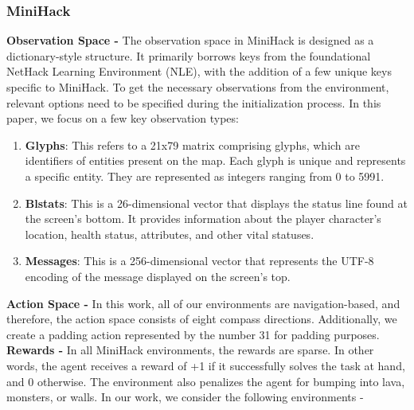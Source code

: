 \documentclass[]{fairmeta}
\begin{document}
\subsubsection{MiniHack}
\textbf{Observation Space - }
The observation space in MiniHack is designed as a dictionary-style structure. It primarily borrows keys from the foundational NetHack Learning Environment (NLE), with the addition of a few unique keys specific to MiniHack. To get the necessary observations from the environment, relevant options need to be specified during the initialization process. In this paper, we focus on a few key observation types:
\begin{enumerate}
    \item \textbf{Glyphs}: This refers to a 21x79 matrix comprising glyphs, which are identifiers of entities present on the map. Each glyph is unique and represents a specific entity. They are represented as integers ranging from 0 to 5991.
    \item \textbf{Blstats}: This is a 26-dimensional vector that displays the status line found at the screen's bottom. It provides information about the player character's location, health status, attributes, and other vital statuses.
    \item \textbf{Messages}: This is a 256-dimensional vector that represents the UTF-8 encoding of the message displayed on the screen's top.
\end{enumerate}
\textbf{Action Space - } In this work, all of our environments are navigation-based, and therefore, the action space consists of eight compass directions. Additionally, we create a padding action represented by the number 31 for padding purposes.
\textbf{Rewards - } In all MiniHack environments, the rewards are sparse. In other words, the agent receives a reward of +1 if it successfully solves the task at hand, and 0 otherwise. The environment also penalizes the agent for bumping into lava, monsters, or walls.
In our work, we consider the following environments -
\end{document}
